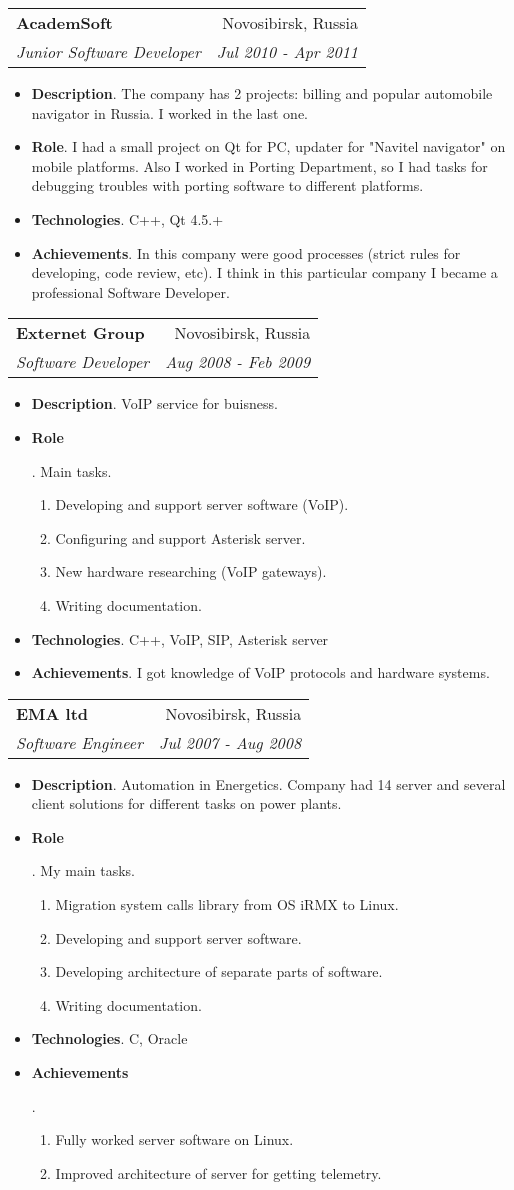 \documentclass[letterpaper,11pt]{article}
\makeatletter
\newcommand{\resumeItem}[2]{
  \item\small{
    \textbf{#1}{. #2 \vspace{-2pt}}
  }
}
\newcommand{\resumeSubheading}[4]{
  \vspace{-1pt}\item
    \begin{tabular*}{0.97\textwidth}{l@{\extracolsep{\fill}}r}
      \textbf{#1} & #2 \\
      \textit{\small#3} & \textit{\small #4} \\
    \end{tabular*}\vspace{-5pt}
}
\newcommand{\resumeItemListStart}{\begin{itemize}}
\newcommand{\resumeItemListEnd}{\end{itemize}\vspace{-5pt}}
\makeatother
\begin{document}
     \resumeSubheading
       {AcademSoft}{Novosibirsk, Russia}
       {Junior Software Developer}{Jul 2010 - Apr 2011}
       \resumeItemListStart
         \resumeItem{Description}
	   {The company has 2 projects: billing and popular automobile navigator in Russia. I worked in the last one.}
	 \resumeItem{Role}
	   {I had a small project on Qt for PC, updater for "Navitel navigator" on mobile platforms. Also I worked in Porting Department, so I had tasks for debugging troubles with porting software to different platforms.}
	 \resumeItem{Technologies}
	   {C++, Qt 4.5.+}
	 \resumeItem{Achievements}{In this company were good processes (strict rules for developing, code review, etc). I think in this particular company I became a professional Software Developer.}
       \resumeItemListEnd

     \resumeSubheading
       {Externet Group}{Novosibirsk, Russia}
       {Software Developer}{Aug 2008 - Feb 2009}
       \resumeItemListStart
         \resumeItem{Description}
	   {VoIP service for buisness.}
	 \resumeItem{Role}
	   {Main tasks.
	     \begin{enumerate}
               \item Developing and support server software (VoIP).
               \item Configuring and support Asterisk server.
	       \item New hardware researching (VoIP gateways).
	       \item Writing documentation.
             \end{enumerate}
	   }
	 \resumeItem{Technologies}
	   {C++, VoIP, SIP, Asterisk server}
	 \resumeItem{Achievements}{I got knowledge of VoIP protocols and hardware systems.}
       \resumeItemListEnd

     \resumeSubheading
      {EMA ltd}{Novosibirsk, Russia}
      {Software Engineer} {Jul 2007 - Aug 2008}
      \resumeItemListStart
        \resumeItem{Description}
          {Automation in Energetics. Company had 14 server and several client solutions for different tasks on power plants.}
        \resumeItem{Role}
          {My main tasks.
            \begin{enumerate}
	      \item Migration system calls library from OS iRMX to Linux.
              \item Developing and support server software.
              \item Developing architecture of separate parts of software.
              \item Writing documentation.
            \end{enumerate}
          }
        \resumeItem{Technologies}
          {C, Oracle}
	\resumeItem{Achievements}
	  {
	    \begin{enumerate}
	      \item Fully worked server software on Linux.
	      \item Improved architecture of server for getting telemetry.
	    \end{enumerate}
	  }
      \resumeItemListEnd
\end{document}
